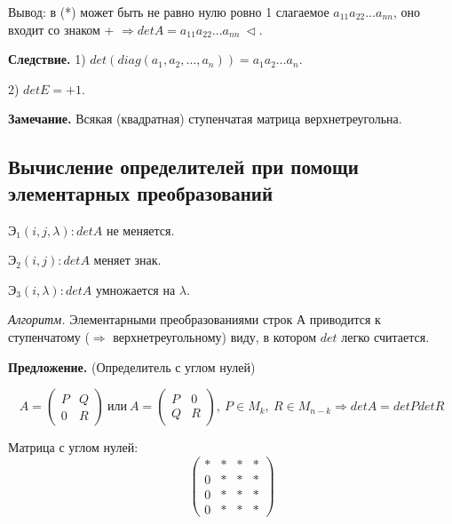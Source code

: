 Вывод: в (*) может быть не равно нулю ровно 1 слагаемое $a_{11} a_{22} \dots a_{nn}$, оно входит со знаком + $\Rightarrow detA  = a_{11} a_{22} \dots a_{nn} \ \lhd$.

\vspace{\baselineskip}
\textbf{Следствие.} 1) $det(diag(a_1, a_2, \dots, a_n)) = a_1 a_2 \dots a_n$.

2) $detE = +1$.

\vspace{\baselineskip}
\textbf{Замечание.} Всякая (квадратная) ступенчатая матрица верхнетреугольна.

\vspace{\baselineskip}
\subsection{Вычисление определителей при помощи элементарных преобразований}

\vspace{\baselineskip}
$Э_1 (i, j, \lambda): detA$ не меняется.

$Э_2 (i, j): detA$ меняет знак.

$Э_3 (i, \lambda): detA$ умножается на $\lambda$.

\vspace{\baselineskip}
\textit{Алгоритм.} Элементарными преобразованиями строк А приводится к ступенчатому  ($\Rightarrow$ верхнетреугольному) виду, в котором $det$ легко считается.

\vspace{\baselineskip}
\textbf{Предложение.} (Определитель с углом нулей) 

\begin{equation*} A = 
\left(
\begin{array}{c|c}
  P & Q \\
  \hline
  0 & R
\end{array}
\right) \ или \ A = 
\left(
\begin{array}{c|c}
  P & 0 \\
  \hline
  Q & R
\end{array}
\right),\ P \in M_k, \ R \in M_{n-k} \Rightarrow detA = detP detR
\end{equation*}

Матрица с углом нулей:
\begin{equation*} 
\left(
\begin{array}{c|ccc}
  * & * & * & * \\
  \hline
  0 & * & * & * \\
  0 & * & * & * \\
  0 & * & * & *
\end{array}
\right)
\end{equation*}

